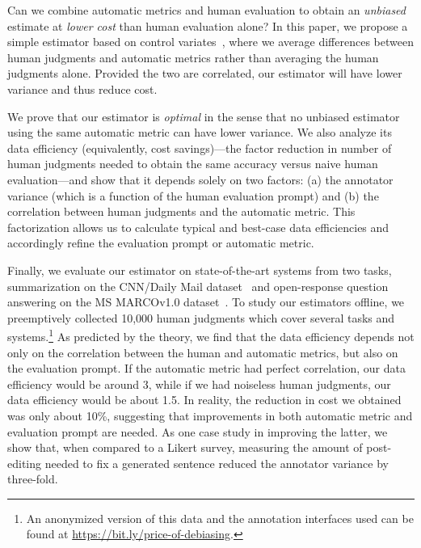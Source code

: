 Can we combine automatic metrics and human evaluation to obtain
an \emph{unbiased} estimate at \emph{lower cost} than human evaluation alone?
In this paper,
we propose a simple estimator based on control variates~\citep{ripley2009stochastic},
where we average differences between human judgments and automatic metrics
rather than averaging the human judgments alone.
Provided the two are correlated,
our estimator will have lower variance and thus reduce cost.

We prove that our estimator is \emph{optimal} in the sense
that no unbiased estimator using the same automatic metric can have lower variance.
We also analyze its data efficiency (equivalently, cost savings)---the factor reduction in number of human judgments needed to obtain the same accuracy versus naive human evaluation---and show that it depends solely on
two factors:
  (a) the annotator variance (which is a function of the human evaluation prompt) and
  (b) the correlation between human judgments and the automatic metric.
This factorization allows us to calculate typical and best-case data efficiencies and accordingly refine the evaluation prompt or automatic metric.

Finally, we evaluate our estimator on state-of-the-art systems from two tasks, summarization on the CNN/Daily Mail dataset~\cite{hermann2015read,nallapati2016abstractive}
and open-response question answering on the MS MARCOv1.0 dataset~\citep{nguyen2016ms}.
To study our estimators offline,
we preemptively collected 10,000 human judgments which cover several tasks and systems.\footnote{%
An anonymized version of this data and the annotation interfaces used can be found at \url{https://bit.ly/price-of-debiasing}.}
As predicted by the theory, we find that the data efficiency depends not only on the correlation between the human and automatic metrics,
but also on the evaluation prompt.
If the automatic metric had perfect correlation, our data efficiency would be around 3, while
  if we had noiseless human judgments, our data efficiency would be about 1.5.
In reality, the reduction in cost we obtained was only about 10\%,
suggesting that improvements in both automatic metric and evaluation prompt are needed.
As one case study in improving the latter, we show that, when compared to a Likert survey, measuring the amount of post-editing needed to fix a generated sentence
reduced the annotator variance by three-fold.




